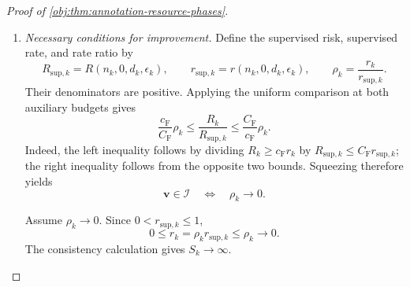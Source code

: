 \documentclass[11pt]{article}
\begin{document}
\begin{proof}[Proof of \cref{obj:thm:annotation-resource-phases}]
\begin{enumerate}
First suppose that, for some real constant \(M_{\mathrm{or}}\),
\[
\frac{R_k}{b_k}\le M_{\mathrm{or}}
\]
eventually. Define
\[
K_{\mathrm{or}}=\frac{\max\{M_{\mathrm{or}},1\}}{c_{\mathrm F}}>0.
\]
The lower comparison then gives, eventually,
\[
c_{\mathrm F}r_k\le R_k
\le \frac{\max\{M_{\mathrm{or}},1\}}{S_k},
\qquad
r_k\le\frac{K_{\mathrm{or}}}{S_k}.
\]
Eventually \(S_k>K_{\mathrm{or}}\), so \(r_k<1\) and its cap is inactive. Thus
\[
1+S_kz_k^2=S_kr_k\le K_{\mathrm{or}},
\qquad
(z_k\sqrt{S_k})^2\le K_{\mathrm{or}}.
\]
All factors are nonnegative, and therefore
\[
z_k\sqrt{S_k}\le\sqrt{K_{\mathrm{or}}},
\qquad
d_k\le
\sqrt{K_{\mathrm{or}}}\,
\frac{N_k\epsilon_k\ell_k}{\sqrt{S_k}}
\]
eventually. This is the required big-\(O\) condition.

Conversely, that big-\(O\) condition supplies a constant \(K_{\mathrm{dim}}>0\) such that eventually
\[
d_k\le K_{\mathrm{dim}}
\frac{N_k\epsilon_k\ell_k}{\sqrt{S_k}}.
\]
Multiplication by the positive factor
\(\sqrt{S_k}/(N_k\epsilon_k\ell_k)\) gives
\[
z_k\sqrt{S_k}\le K_{\mathrm{dim}},
\qquad
S_kz_k^2\le K_{\mathrm{dim}}^2.
\]
Consequently,
\[
r_k\le S_k^{-1}+z_k^2
\le\frac{1+K_{\mathrm{dim}}^2}{S_k},
\qquad
\frac{R_k}{b_k}
\le C_{\mathrm F}(1+K_{\mathrm{dim}}^2)
\]
eventually. This proves the oracle equivalence.

\item \emph{Necessary conditions for improvement.}
Define the supervised risk, supervised rate, and rate ratio by
\[
R_{\mathrm{sup},k}=R(n_k,0,d_k,\epsilon_k),\qquad
r_{\mathrm{sup},k}=r(n_k,0,d_k,\epsilon_k),\qquad
\rho_k=\frac{r_k}{r_{\mathrm{sup},k}}.
\]
Their denominators are positive. Applying the uniform comparison at both auxiliary budgets gives
\[
\frac{c_{\mathrm F}}{C_{\mathrm F}}\rho_k
\le \frac{R_k}{R_{\mathrm{sup},k}}
\le \frac{C_{\mathrm F}}{c_{\mathrm F}}\rho_k.
\]
Indeed, the left inequality follows by dividing
\(R_k\ge c_{\mathrm F}r_k\) by
\(R_{\mathrm{sup},k}\le C_{\mathrm F}r_{\mathrm{sup},k}\);
the right inequality follows from the opposite two bounds. Squeezing therefore yields
\[
\mathbf v\in\mathcal I
\quad\Longleftrightarrow\quad
\rho_k\longrightarrow0.
\]

Assume \(\rho_k\to0\). Since \(0<r_{\mathrm{sup},k}\le1\),
\[
0\le r_k=\rho_kr_{\mathrm{sup},k}\le\rho_k\longrightarrow0.
\]
The consistency calculation gives \(S_k\to\infty\).


\end{enumerate}
\end{proof}
\end{document}
